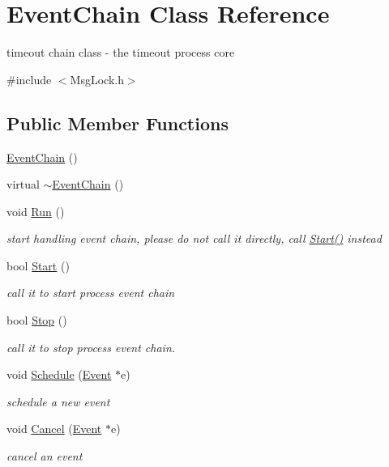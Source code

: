 \hypertarget{classEventChain}{\section{\-Event\-Chain \-Class \-Reference}
\label{df/dd4/classEventChain}
}


timeout chain class -\/ the timeout process core  




{\ttfamily \#include $<$\-Msg\-Lock.\-h$>$}

\subsection*{\-Public \-Member \-Functions}
\begin{DoxyCompactItemize}
\item 
\hyperlink{classEventChain_ada7e8a70f9a8d1401ae8688d1c229c48}{\-Event\-Chain} ()
\item 
virtual \hyperlink{classEventChain_a236195bf33b701dbc51aed3f2626a3ce}{$\sim$\-Event\-Chain} ()
\item 
void \hyperlink{classEventChain_a5946605e94f28745049b188436d1b4d9}{\-Run} ()
\begin{DoxyCompactList}\small\item\em start handling event chain, please do not call it directly, call \hyperlink{classEventChain_a16e7a78c2ed7f99f317bd3e07af1d8f9}{\-Start()} instead \end{DoxyCompactList}\item 
bool \hyperlink{classEventChain_a16e7a78c2ed7f99f317bd3e07af1d8f9}{\-Start} ()
\begin{DoxyCompactList}\small\item\em call it to start process event chain \end{DoxyCompactList}\item 
bool \hyperlink{classEventChain_aa1291ec4c607b26362ce57269f90e7cb}{\-Stop} ()
\begin{DoxyCompactList}\small\item\em call it to stop process event chain. \end{DoxyCompactList}\item 
void \hyperlink{classEventChain_ac986b5d2267157e6e8bb6deadef8b973}{\-Schedule} (\hyperlink{classEvent}{\-Event} $\ast$e)
\begin{DoxyCompactList}\small\item\em schedule a new event \end{DoxyCompactList}\item 
void \hyperlink{classEventChain_af62373dcc9dd1b677eb957f8ba2c46c5}{\-Cancel} (\hyperlink{classEvent}{\-Event} $\ast$e)
\begin{DoxyCompactList}\small\item\em cancel an event \end{DoxyCompactList}\end{DoxyCompactItemize}
